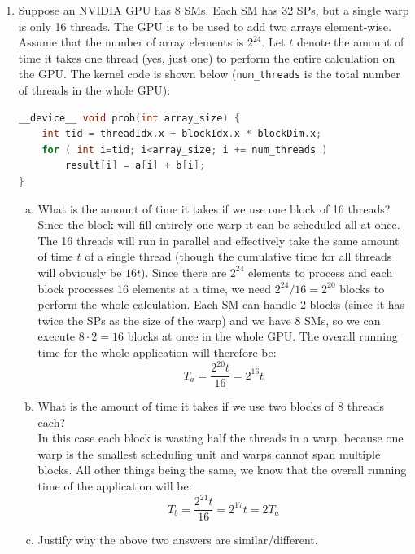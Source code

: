 \documentclass{article}
\begin{document}
\begin{enumerate}[1.]
    \item Suppose an NVIDIA GPU has 8 SMs. Each SM has 32 SPs, but a single warp is only 16
    threads. The GPU is to be used to add two arrays element-wise. Assume that the number of array
    elements is $2^{24}$. Let $t$ denote the amount of time it takes one thread (yes, just one) to perform the
    entire calculation on the GPU. The kernel code is shown below (\texttt{num\_threads} is the total number
    of threads in the whole GPU):
\begin{lstlisting}[language=C]
__device__ void prob(int array_size) {
    int tid = threadIdx.x + blockIdx.x * blockDim.x;
    for ( int i=tid; i<array_size; i += num_threads )
        result[i] = a[i] + b[i];
}\end{lstlisting}
    \begin{enumerate}[(a)]
        \item What is the amount of time it takes if we use one block of 16 threads?\\
        Since the block will fill entirely one warp it can be scheduled all at once. The 16 threads will run in parallel and effectively take the same amount of time $t$ of a single thread (though the cumulative time for all threads will obviously be $16t$). Since there are $2^{24}$ elements to process and each block processes 16 elements at a time, we need $2^{24} / 16 = 2^{20}$ blocks to perform the whole calculation. Each SM can handle 2 blocks (since it has twice the SPs as the size of the warp) and we have 8 SMs, so we can execute $8 \cdot 2 = 16$ blocks at once in the whole GPU. The overall running time for the whole application will therefore be:
        \begin{equation*}
            T_a = \frac{2^{20}t}{16} = 2^{16}t
        \end{equation*}
        \item What is the amount of time it takes if we use two blocks of 8 threads each?\\
        In this case each block is wasting half the threads in a warp, because one warp is the smallest scheduling unit and warps cannot span multiple blocks. All other things being the same, we know that the overall running time of the application will be:
        \begin{equation*}
            T_b = \frac{2^{21}t}{16} = 2^{17}t = 2 T_a
        \end{equation*}
        \item Justify why the above two answers are similar/different.\\

\end{enumerate}
\end{enumerate}
\end{document}
